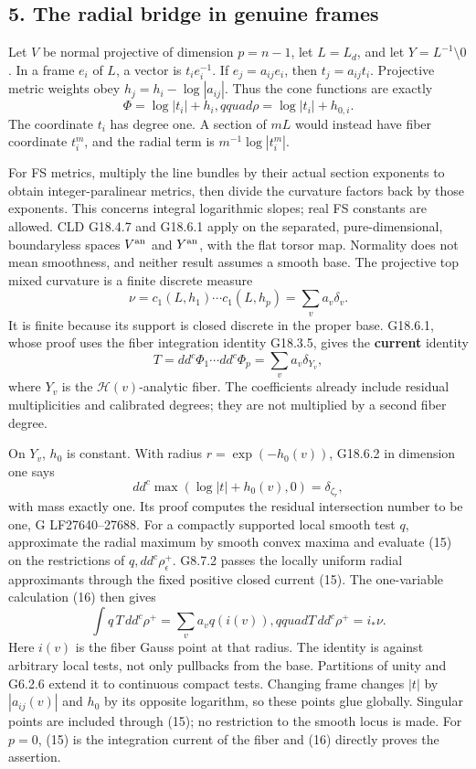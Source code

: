 \documentclass[
  11pt,
]{article}
\begin{document}
\subsection{5. The radial bridge in genuine
frames}\label{the-radial-bridge-in-genuine-frames}

Let \(V\) be normal projective of dimension \(p=n-1\), let \(L=L_d\),
and let \(Y=L^{-1}\setminus0\). In a frame \(e_i\) of \(L\), a vector is
\(t_i e_i^{-1}\). If \(e_j=a_{ij}e_i\), then \(t_j=a_{ij}t_i\).
Projective metric weights obey \(h_j=h_i-\log|a_{ij}|\). Thus the cone
functions are exactly
\[ \Phi=\log|t_i|+h_i,qquad \rho=\log|t_i|+h_{0,i}.                     \tag{14}\]
The coordinate \(t_i\) has degree one. A section of \(mL\) would instead
have fiber coordinate \(t_i^m\), and the radial term is
\(m^{-1}\log|t_i^m|\).

For FS metrics, multiply the line bundles by their actual section
exponents to obtain integer-paralinear metrics, then divide the
curvature factors back by those exponents. This concerns integral
logarithmic slopes; real FS constants are allowed. CLD G18.4.7 and
G18.6.1 apply on the separated, pure-dimensional, boundaryless spaces
\(V^{\rm an}\) and \(Y^{\rm an}\), with the flat torsor map. Normality
does not mean smoothness, and neither result assumes a smooth base. The
projective top mixed curvature is a finite discrete measure
\[ \nu=c_1(L,h_1)\cdots c_1(L,h_p)=\sum_v a_v\delta_v.\] It is finite
because its support is closed discrete in the proper base. G18.6.1,
whose proof uses the fiber integration identity G18.3.5, gives the
\textbf{current} identity
\[ T=dd^c\Phi_1\cdots dd^c\Phi_p=\sum_v a_v\delta_{Y_v},                 \tag{15}\]
where \(Y_v\) is the \(\mathcal H(v)\)-analytic fiber. The coefficients
already include residual multiplicities and calibrated degrees; they are
not multiplied by a second fiber degree.

On \(Y_v\), \(h_0\) is constant. With radius \(r=\exp(-h_0(v))\),
G18.6.2 in dimension one says
\[ dd^c\max(\log|t|+h_0(v),0)=\delta_{\zeta_r},                          \tag{16}\]
with mass exactly one. Its proof computes the residual intersection
number to be one, G LF27640--27688. For a compactly supported local
smooth test \(q\), approximate the radial maximum by smooth convex
maxima and evaluate (15) on the restrictions of
\(q,dd^c\rho_\epsilon^+\). G8.7.2 passes the locally uniform radial
approximants through the fixed positive closed current (15). The
one-variable calculation (16) then gives
\[ \int q\,T\,dd^c\rho^+=\sum_v a_v q(i(v)),qquad
 T\,dd^c\rho^+=i_*\nu.                                                  \tag{17}\]
Here \(i(v)\) is the fiber Gauss point at that radius. The identity is
against arbitrary local tests, not only pullbacks from the base.
Partitions of unity and G6.2.6 extend it to continuous compact tests.
Changing frame changes \(|t|\) by \(|a_{ij}(v)|\) and \(h_0\) by its
opposite logarithm, so these points glue globally. Singular points are
included through (15); no restriction to the smooth locus is made. For
\(p=0\), (15) is the integration current of the fiber and (16) directly
proves the assertion.
\end{document}
